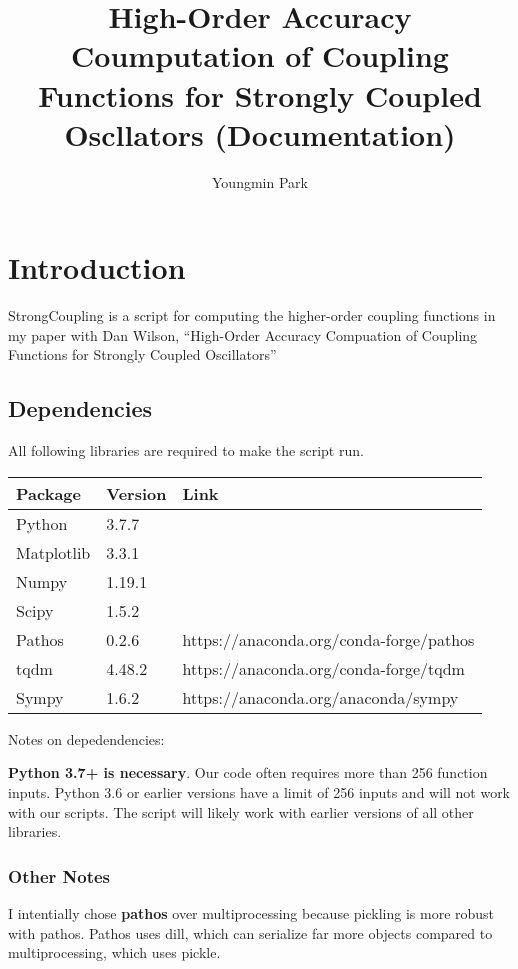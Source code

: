 \documentclass[
  english,
  a4paper,
  oneside]{article}
\title{High-Order Accuracy Coumputation of Coupling Functions for Strongly
Coupled Oscllators (Documentation)}
\author{Youngmin Park}
\date{}
\begin{document}
\maketitle

{
\hypersetup{linkcolor=}
\setcounter{tocdepth}{4}
\tableofcontents
}
\hypertarget{introduction}{%
\section{Introduction}\label{introduction}}

StrongCoupling is a script for computing the higher-order coupling
functions in my paper with Dan Wilson, ``High-Order Accuracy Compuation
of Coupling Functions for Strongly Coupled Oscillators''

\hypertarget{dependencies}{%
\subsection{Dependencies}\label{dependencies}}

All following libraries are required to make the script run.

\begin{longtable}[]{@{}lll@{}}
\toprule
Package & Version & Link\tabularnewline
\midrule
\endhead
Python & 3.7.7 &\tabularnewline
Matplotlib & 3.3.1 &\tabularnewline
Numpy & 1.19.1 &\tabularnewline
Scipy & 1.5.2 &\tabularnewline
Pathos & 0.2.6 & https://anaconda.org/conda-forge/pathos\tabularnewline
tqdm & 4.48.2 & https://anaconda.org/conda-forge/tqdm\tabularnewline
Sympy & 1.6.2 & https://anaconda.org/anaconda/sympy\tabularnewline
\bottomrule
\end{longtable}

Notes on depedendencies:

\textbf{Python 3.7+ is necessary}. Our code often requires more than 256
function inputs. Python 3.6 or earlier versions have a limit of 256
inputs and will not work with our scripts. The script will likely work
with earlier versions of all other libraries.

\hypertarget{other-notes}{%
\subsubsection{Other Notes}\label{other-notes}}

I intentially chose \textbf{pathos} over multiprocessing because
pickling is more robust with pathos. Pathos uses dill, which can
serialize far more objects compared to multiprocessing, which uses
pickle.
\end{document}
